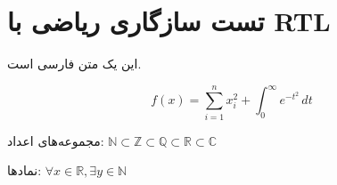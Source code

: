 \documentclass{article}
\begin{document}
\section{تست سازگاری ریاضی با RTL}

این یک متن فارسی است.

\begin{equation}
    \label{eq:test}
    f(x) = \sum_{i=1}^{n} x_i^2 + \int_{0}^{\infty} e^{-t^2} \, dt
\end{equation}

مجموعه‌های اعداد: $\mathbb{N} \subset \mathbb{Z} \subset \mathbb{Q} \subset \mathbb{R} \subset \mathbb{C}$

نمادها: $\forall x \in \mathbb{R}, \exists y \in \mathbb{N}$
\end{document}
